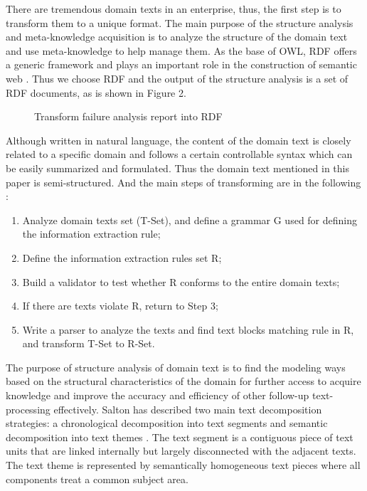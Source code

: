 \documentclass{elsart}
\begin{document}
There are tremendous domain texts in an enterprise, thus, the first step
is to transform them to a unique format. The main purpose of the
structure analysis and meta-knowledge acquisition is to analyze the
structure of the domain text and use meta-knowledge to help manage
them. As the base of OWL, RDF offers a generic framework and plays an
important role in the construction of semantic web \cite{lassila1999rdf}. Thus we
choose RDF and the output of the structure analysis is a set of RDF
documents, as is shown in Figure 2. 
\begin{figure}[htp]
  \centering
{}

  \caption{Transform failure analysis report into RDF}
  \label{fig:2}
\end{figure}
Although written in natural language, the content of the domain text
is closely related to a specific domain and follows a certain
controllable syntax which can be easily summarized and
formulated. Thus the domain text mentioned in this paper is
semi-structured. And the main steps of transforming are in the following \cite{Wang2008}:
\begin{enumerate}
\item Analyze domain texts set (T-Set), and define a grammar G used for
defining the information extraction rule;
\item Define the information extraction rules set R;
\item Build a validator to test whether R conforms to the entire domain
texts;
\item If there are texts violate R, return to Step 3;
\item Write a parser to analyze the texts and find text blocks
matching rule in R, and transform T-Set to R-Set.  
\end{enumerate}


The purpose of structure analysis of domain text is to find the
modeling ways based on the structural characteristics of the domain
for further access to acquire knowledge and improve
the accuracy and efficiency of other follow-up
text-processing effectively. Salton has described two main text decomposition
strategies: a chronological decomposition into text segments
and semantic decomposition into text themes \cite{234834}. The text segment is
a contiguous piece of text units that are linked internally but
largely disconnected with the adjacent texts. The text theme is
represented by semantically homogeneous text pieces where all
components treat a common subject area.
\end{document}
